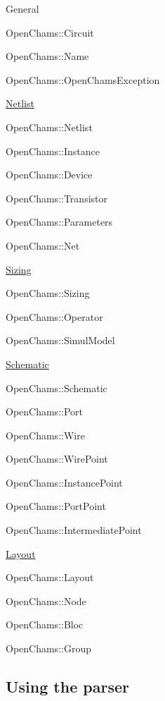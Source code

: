 \begin{DoxyItemize}
\item General
\begin{DoxyItemize}
\item Open\+Chams\+::\+Circuit
\item Open\+Chams\+::\+Name
\item Open\+Chams\+::\+Open\+Chams\+Exception
\end{DoxyItemize}
\item \mbox{\hyperlink{class_netlist}{Netlist}}
\begin{DoxyItemize}
\item Open\+Chams\+::\+Netlist
\item Open\+Chams\+::\+Instance
\item Open\+Chams\+::\+Device
\item Open\+Chams\+::\+Transistor
\item Open\+Chams\+::\+Parameters
\item Open\+Chams\+::\+Net
\end{DoxyItemize}
\item \mbox{\hyperlink{class_sizing}{Sizing}}
\begin{DoxyItemize}
\item Open\+Chams\+::\+Sizing
\item Open\+Chams\+::\+Operator
\item Open\+Chams\+::\+Simul\+Model
\end{DoxyItemize}
\item \mbox{\hyperlink{class_schematic}{Schematic}}
\begin{DoxyItemize}
\item Open\+Chams\+::\+Schematic
\item Open\+Chams\+::\+Port
\item Open\+Chams\+::\+Wire
\item Open\+Chams\+::\+Wire\+Point
\item Open\+Chams\+::\+Instance\+Point
\item Open\+Chams\+::\+Port\+Point
\item Open\+Chams\+::\+Intermediate\+Point
\end{DoxyItemize}
\item \mbox{\hyperlink{class_layout}{Layout}}
\begin{DoxyItemize}
\item Open\+Chams\+::\+Layout
\item Open\+Chams\+::\+Node
\item Open\+Chams\+::\+Bloc
\item Open\+Chams\+::\+Group
\end{DoxyItemize}
\end{DoxyItemize}\hypertarget{openchams_openChamsParser}{}\subsection{Using the parser}\label{openchams_openChamsParser}
